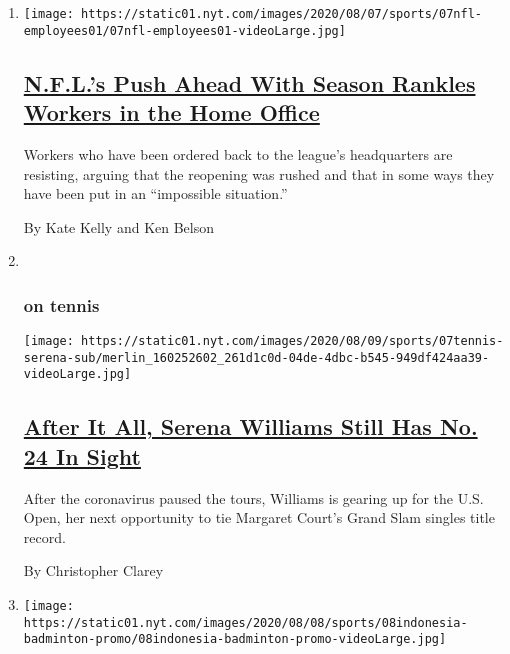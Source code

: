 \begin{enumerate}
\def\labelenumi{\arabic{enumi}.}
\item
  \texttt{[image: https://static01.nyt.com/images/2020/08/07/sports/07nfl-employees01/07nfl-employees01-videoLarge.jpg]}

  \hypertarget{nfls-push-ahead-with-season-rankles-workers-in-the-home-office}{%
  \subsection{\texorpdfstring{\href{/2020/08/07/sports/football/coronavirus-nfl-restart-season.html}{N.F.L.'s
  Push Ahead With Season Rankles Workers in the Home
  Office}}{N.F.L.'s Push Ahead With Season Rankles Workers in the Home Office}}\label{nfls-push-ahead-with-season-rankles-workers-in-the-home-office}}

  Workers who have been ordered back to the league's headquarters are
  resisting, arguing that the reopening was rushed and that in some ways
  they have been put in an ``impossible situation.''

  By Kate Kelly and Ken Belson
\item ~
  \hypertarget{on-tennis}{%
  \subsubsection{on tennis}\label{on-tennis}}

  \texttt{[image: https://static01.nyt.com/images/2020/08/09/sports/07tennis-serena-sub/merlin\_160252602\_261d1c0d-04de-4dbc-b545-949df424aa39-videoLarge.jpg]}

  \hypertarget{after-it-all-serena-williams-still-has-no-24-in-sight}{%
  \subsection{\texorpdfstring{\href{/2020/08/07/sports/tennis/serena-williams-us-open.html}{After
  It All, Serena Williams Still Has No. 24 In
  Sight}}{After It All, Serena Williams Still Has No. 24 In Sight}}\label{after-it-all-serena-williams-still-has-no-24-in-sight}}

  After the coronavirus paused the tours, Williams is gearing up for the
  U.S. Open, her next opportunity to tie Margaret Court's Grand Slam
  singles title record.

  By Christopher Clarey
\item
  \texttt{[image: https://static01.nyt.com/images/2020/08/08/sports/08indonesia-badminton-promo/08indonesia-badminton-promo-videoLarge.jpg]}


\end{enumerate}
